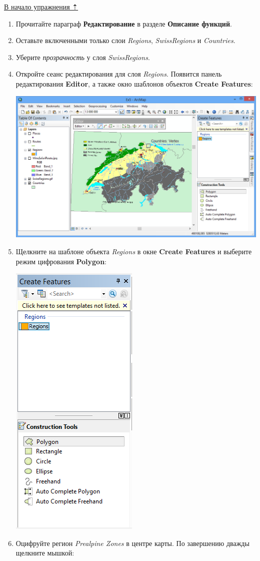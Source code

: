 \documentclass[]{book}
\theoremstyle{definition}
\theoremstyle{definition}
\theoremstyle{definition}
\theoremstyle{remark}
\begin{document}
\protect\hyperlink{map-ref-general}{В начало упражнения ⇡}

\begin{enumerate}
\def\labelenumi{\arabic{enumi}.}
\item
  Прочитайте параграф \textbf{Редактирование} в разделе \textbf{Описание
  функций}.
\item
  Оставьте включенными только слои \emph{Regions}, \emph{SwissRegions} и
  \emph{Countries}.
\item
  Уберите \emph{прозрачность} у слоя \emph{SwissRegions}.
\item
  Откройте сеанс редактирования для слоя \emph{Regions}. Появится панель
  редактирования \textbf{Editor}, а также окно шаблонов объектов
  \textbf{Create Features}:

  \includegraphics{images/Ex05/image15.png}
\item
  Щелкните на шаблоне объекта \emph{Regions} в окне \textbf{Create
  Features} и выберите режим цифрования \textbf{Polygon}:

  \includegraphics{images/Ex05/image16.png}
\item
  Оцифруйте регион \emph{Prealpine Zones} в центре карты. По завершению
  дважды щелкните мышкой:


\end{enumerate}
\end{document}
